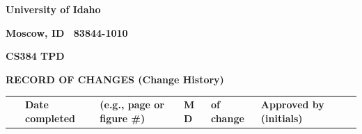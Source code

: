 \documentclass[twoside,letterpaper]{article}
\begin{document}
\bigskip

{\centering\bfseries
University of Idaho
\par}

{\centering\bfseries
Moscow, ID \ 83844-1010
\par}

\pagebreak


{\centering\bfseries
CS384 TPD
\par}



{\centering\bfseries
RECORD OF CHANGES (Change History)
\par}

\begin{flushleft}
\tablehead{}
\begin{supertabular}{|m{0.5462598in}|m{0.6712598in}|m{1.4212599in}|m{0.23375985in}|m{1.7962599in}|m{0.7337598in}|m{0.6295598in}|}
\hline
~

\par
{}\par
&

\centering \bfseries Date completed
&

\par
\centering \bfseries (e.g., page or
figure \#) &

\par
\centering \bfseries M\newline
D
&

\par
\centering \bfseries of change 
&

\centering \bfseries Approved by
(initials) 
&


\end{supertabular}
\end{flushleft}
\end{document}
